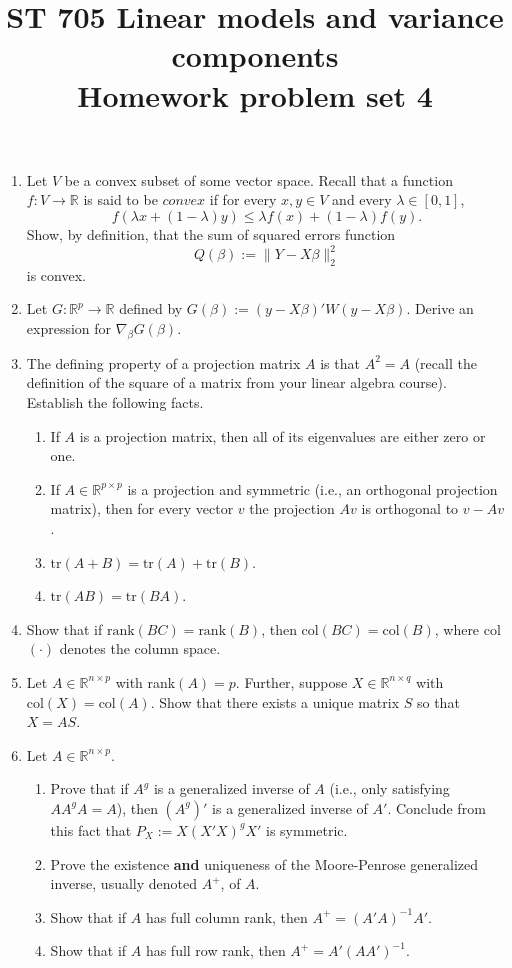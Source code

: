 \documentclass[11pt]{article}
\title{ST 705 Linear models and variance components \\ 
        Homework problem set 4}
\begin{document}
\maketitle

\begin{enumerate}


\item Let $V$ be a convex subset of some vector space.  Recall that a function $f : V \to \mathbb{R}$ is said to be $convex$ if for every $x, y \in V$ and every $\lambda \in [0,1]$,
\[
f(\lambda x + (1-\lambda)y) \le \lambda f(x) + (1-\lambda) f(y).
\]
Show, by definition, that the sum of squared errors function
\[
Q(\beta) := \|Y - X\beta\|_{2}^{2}
\]
is convex.

\item Let $G : \mathbb{R}^{p} \to \mathbb{R}$ defined by $G(\beta) := (y - X\beta)'W(y - X\beta)$.  Derive an expression for $\nabla_{\beta}G(\beta)$.

\item The defining property of a projection matrix $A$ is that $A^{2} = A$ (recall the definition of the square of a matrix from your linear algebra course).  Establish the following facts.
\begin{enumerate}
\item If $A$ is a projection matrix, then all of its eigenvalues are either zero or one. 
\item If $A \in \mathbb{R}^{p\times p}$ is a projection and symmetric (i.e., an orthogonal projection matrix), then for every vector $v$ the projection $Av$ is orthogonal to $v - Av$.
\item $\text{tr}(A + B) = \text{tr}(A) + \text{tr}(B)$.
\item $\text{tr}(AB) = \text{tr}(BA)$.
\end{enumerate}

\item Show that if $\text{rank}(BC) = \text{rank}(B)$, then $\text{col}(BC) = \text{col}(B)$, where col$(\cdot)$ denotes the column space.

\item Let $A \in \mathbb{R}^{n\times p}$ with rank$(A) = p$.  Further, suppose  $X \in \mathbb{R}^{n\times q}$ with $\text{col}(X) = \text{col}(A)$.  Show that there exists a unique matrix $S$ so that $X = AS$.

\item Let $A \in \mathbb{R}^{n\times p}$.
\begin{enumerate}
\item Prove that if $A^{g}$ is a generalized inverse of $A$ (i.e., only satisfying $AA^{g}A = A$), then $(A^{g})'$ is a generalized inverse of $A'$.  Conclude from this fact that $P_{X} := X(X'X)^{g}X'$ is symmetric.
\item Prove the existence \textbf{and} uniqueness of the Moore-Penrose generalized inverse, usually denoted $A^{+}$, of $A$.
\item Show that if $A$ has full column rank, then $A^{+} = (A'A)^{-1}A'$.  
\item Show that if $A$ has full row rank, then $A^{+} = A'(AA')^{-1}$.
\end{enumerate}


\end{enumerate}
\end{document}
